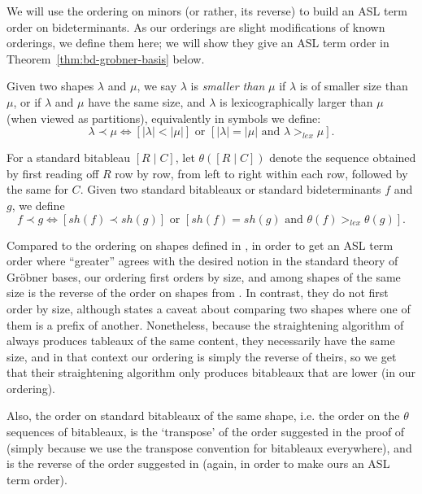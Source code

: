 \documentclass[11pt,reqno]{amsart}
\newcommand{\bitab}[2]{[#1\;|\;#2]}
\newcommand{\shapetab}[1]{sh(#1)}
\newcommand{\sizetab}[1]{|#1|}
\theoremstyle{definition}
\numberwithin{equation}{section}
\begin{document}
We will use the ordering on minors (or rather, its reverse) to build an ASL term order on bideterminants. As our orderings are slight modifications of known orderings, we define them here; we will show they give an ASL term order in Theorem~\ref{thm:bd-grobner-basis} below. 

\begin{definition}[store=defshapeorder, note={Total order on shapes ($\prec$)}]
\label{def:shape-order}
Given two shapes $\lambda$ and $\mu$, we say $\lambda$ is \emph{smaller than} $\mu$ if $\lambda$ is of smaller size than $\mu$, or if $\lambda$ and $\mu$ have the same size, and $\lambda$ is lexicographically larger than $\mu$ (when viewed as partitions), equivalently in symbols we define:
\[
\lambda \prec \mu \iff [\sizetab{\lambda} < \sizetab{\mu}] \text{ or } [\sizetab{\lambda} = \sizetab{\mu} \text{ and } \lambda >_{lex} \mu].\]
\end{definition}

\begin{definition}[store=defnorderbitab, note={Total order on standard bitableaux/bideterminants $(\prec)$\footnote{Abusing notation by reusing $\prec$.}}]
\label{defn:order-bitab}
For a standard bitableau $\bitab{R}{C}$, let $\theta(\bitab{R}{C})$ denote the sequence obtained by first reading off $R$ row by row, from left to right within each row, followed by the same for $C$. Given two standard bitableaux or standard bideterminants $f$ and $g$, we define
\[f \prec g \iff \left[\shapetab{f} \prec \shapetab{g}\right] \text{ or } \left[\shapetab{f} = \shapetab{g} \text{ and } \theta(f) >_{lex} \theta(g)\right].\]
\end{definition}

\begin{remark}
Compared to the ordering on shapes defined in \cite{desarmenien1982invariant}, in order to get an ASL term order where ``greater'' agrees with the desired notion in the standard theory of Gröbner bases, our ordering first orders by size, and among shapes of the same size is the reverse of the order on shapes from \cite{desarmenien1982invariant}. In contrast, they do not first order by size, although \cite{grinberginvariant} states a caveat about comparing two shapes where one of them is a prefix of another. Nonetheless, because the straightening algorithm of \cite[Theorem~1]{desarmenien1982invariant} always produces tableaux of the same content, they necessarily have the same size, and in that context our ordering is simply the reverse of theirs, so we get that their straightening algorithm only produces bitableaux that are lower (in our ordering).

Also, the order on standard bitableaux of the same shape, i.e. the order on the $\theta$ sequences of bitableaux, is the `transpose' of the order suggested in the proof of \cite[Theorem~1]{desarmenien1982invariant} (simply because we use the transpose convention for bitableaux everywhere), and is the reverse of the order suggested in \cite{desarmenien1980algorithm} (again, in order to make ours an ASL term order).
\end{remark}
\end{document}
